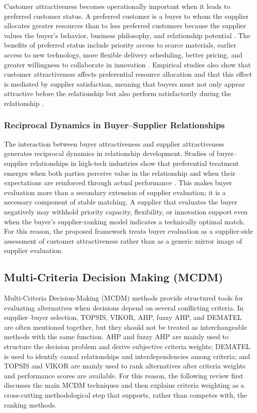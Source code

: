 \documentclass[11pt]{article}
\begin{document}
Customer attractiveness becomes operationally important when it leads to preferred customer status. A preferred customer is a buyer to whom the supplier allocates greater resources than to less preferred customers because the supplier values the buyer's behavior, business philosophy, and relationship potential \cite{ref14}. The benefits of preferred status include priority access to scarce materials, earlier access to new technology, more flexible delivery scheduling, better pricing, and greater willingness to collaborate in innovation \cite{ref32}. Empirical studies also show that customer attractiveness affects preferential resource allocation and that this effect is mediated by supplier satisfaction, meaning that buyers must not only appear attractive before the relationship but also perform satisfactorily during the relationship \cite{ref14}.

\subsubsection{Reciprocal Dynamics in Buyer--Supplier Relationships}

The interaction between buyer attractiveness and supplier attractiveness generates reciprocal dynamics in relationship development. Studies of buyer--supplier relationships in high-tech industries show that preferential treatment emerges when both parties perceive value in the relationship and when their expectations are reinforced through actual performance \cite{ref14,ref32}. This makes buyer evaluation more than a secondary extension of supplier evaluation; it is a necessary component of stable matching. A supplier that evaluates the buyer negatively may withhold priority capacity, flexibility, or innovation support even when the buyer's supplier-ranking model indicates a technically optimal match. For this reason, the proposed framework treats buyer evaluation as a supplier-side assessment of customer attractiveness rather than as a generic mirror image of supplier evaluation.

\subsection{Multi-Criteria Decision Making (MCDM)}

Multi-Criteria Decision-Making (MCDM) methods provide structured tools for evaluating alternatives when decisions depend on several conflicting criteria. In supplier--buyer selection, TOPSIS, VIKOR, AHP, fuzzy AHP, and DEMATEL are often mentioned together, but they should not be treated as interchangeable methods with the same function. AHP and fuzzy AHP are mainly used to structure the decision problem and derive subjective criteria weights; DEMATEL is used to identify causal relationships and interdependencies among criteria; and TOPSIS and VIKOR are mainly used to rank alternatives after criteria weights and performance scores are available. For this reason, the following review first discusses the main MCDM techniques and then explains criteria weighting as a cross-cutting methodological step that supports, rather than competes with, the ranking methods.
\end{document}
